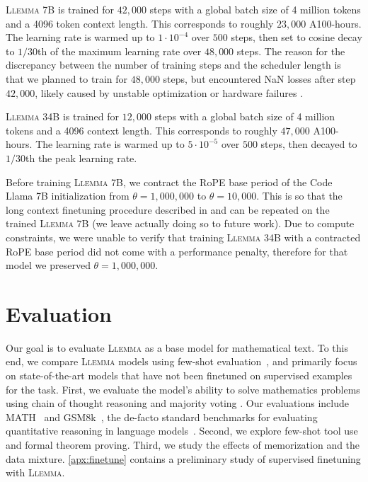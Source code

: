 \textsc{Llemma} 7B is trained for $42,000$ steps with a global batch size of 4 million tokens and a 4096 token context length. This corresponds to roughly $23,000$ A100-hours. The learning rate is warmed up to $1\cdot 10^{-4}$ over $500$ steps, then set to cosine decay to $1/30$th of the maximum learning rate over $48,000$ steps. The reason for the discrepancy between the number of training steps and the scheduler length is that we planned to train for $48,000$ steps, but encountered NaN losses after step $42,000$, likely caused by unstable optimization or hardware failures \citep{adept-sdc}.

\textsc{Llemma} 34B is trained for $12,000$ steps with a global batch size of 4 million tokens and a 4096 context length. This corresponds to roughly $47,000$ A100-hours. The learning rate is warmed up to $5\cdot 10^{-5}$ over $500$ steps, then decayed to $1/30$th the peak learning rate. 

Before training \textsc{Llemma} 7B, we contract the RoPE \citep{su2022roformer} base period of the Code Llama 7B initialization from $\theta=1,000,000$ to $\theta=10,000$. This is so that the long context finetuning procedure described in \cite{peng2023yarn}and \cite{roziere2023code} can be repeated on the trained \textsc{Llemma} 7B (we leave actually doing so to future work). Due to compute constraints, we were unable to verify that training \textsc{Llemma} 34B with a contracted RoPE base period did not come with a performance penalty, therefore for that model we preserved $\theta = 1,000,000$. 

\section{Evaluation}

Our goal is to evaluate \textsc{Llemma} as a base model for mathematical text. To this end, we compare \textsc{Llemma} models using few-shot evaluation~\citep{brown2020gpt3}, and primarily focus on state-of-the-art models that have not been finetuned on supervised examples for the task. First, we evaluate the model's ability to solve mathematics  problems using chain of thought reasoning \citep{wei2023chainofthought} and majority voting \citep{wang2023selfconsistency}. Our evaluations include MATH~\citep{hendrycksmath2021} and GSM8k~\citep{cobbe2021gsm8k}, the de-facto standard benchmarks for evaluating quantitative reasoning in language models~\citep{lewkowycz2022solving}. Second, we explore  few-shot tool use and formal theorem proving. Third, we study the effects of memorization and the data mixture. \autoref{apx:finetune} contains a preliminary study of supervised finetuning with \textsc{Llemma}.

